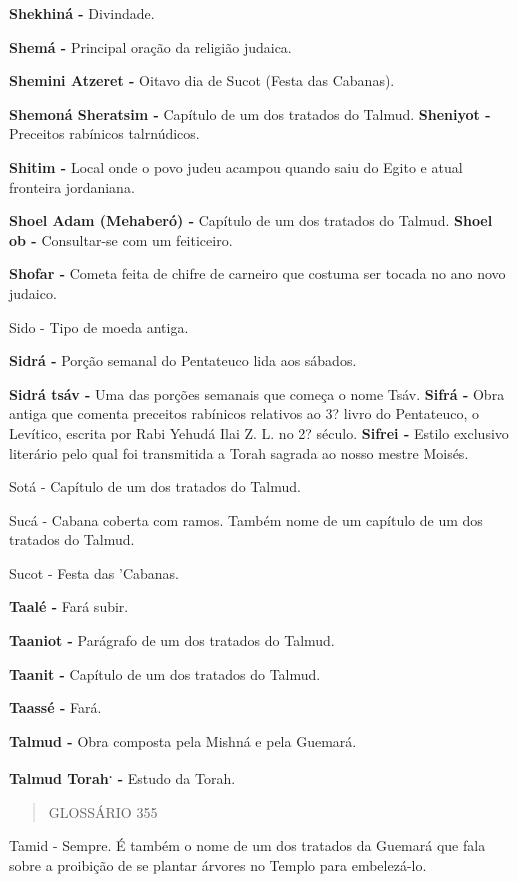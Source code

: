 \textbf{Shekhiná -} Divindade.

\textbf{Shemá -} Principal oração da religião judaica.

\textbf{Shemini Atzeret -} Oitavo dia de Su­cot (Festa das Cabanas).

\textbf{Shemoná Sheratsim -} Capítulo de um dos tratados do Talmud.
\textbf{Sheniyot -} Preceitos rabínicos talrnú­dicos.

\textbf{Shitim -} Local onde o povo judeu acampou quando saiu do Egito e
atual fronteira jordaniana.

\textbf{Shoel Adam (Mehaberó) -} Capítulo de um dos tratados do Talmud.
\textbf{Shoel ob -} Consultar-se com um feiti­ceiro.

\textbf{Shofar -} Cometa feita de chifre de car­neiro que costuma ser
tocada no ano novo judaico.

Sido - Tipo de moeda antiga.

\textbf{Sidrá -} Porção semanal do Pentateu­co lida aos sábados.

\textbf{Sidrá tsáv -} Uma das porções sema­nais que começa o nome Tsáv.
\textbf{Sifrá -} Obra antiga que comenta pre­ceitos rabínicos relativos
ao 3? livro do Pentateuco, o Levítico, escrita por Ra­bi Yehudá Ilai Z.
L. no 2? século. \textbf{Sifrei -} Estilo exclusivo literário pelo qual
foi transmitida a Torah sagrada ao nosso mestre Moisés.

Sotá - Capítulo de um dos tratados do Talmud.

Sucá - Cabana coberta com ramos. Também nome de um capítulo de um dos
tratados do Talmud.

Sucot - Festa das 'Cabanas.

\textbf{Taalé -} Fará subir.

\textbf{Taaniot -} Parágrafo de um dos trata­dos do Talmud.

\textbf{Taanit -} Capítulo de um dos tratados do Talmud.

\textbf{Taassé -} Fará.

\textbf{Talmud -} Obra composta pela Mish­ná e pela Guemará.

\textbf{Talmud Torah\textsuperscript{.} -} Estudo da Torah.

\begin{quote}
GLOSSÁRIO 355
\end{quote}

Tamid - Sempre. É também o nome de um dos tratados da Guemará que fala
sobre a proibição de se plantar árvo­res no Templo para embelezá-lo.

